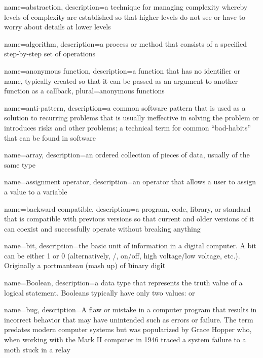 
{
  name=abstraction,
  description={a technique for managing complexity whereby levels of complexity are established so that higher levels do not see or have to worry about details at lower levels}
}

{
  name=algorithm,
  description={a process or method that consists of a specified step-by-step set of operations}
}

{
  name=anonymous function,
  description={a function that has no identifier or name, typically created so that it can be passed as an argument to another function as a callback},
  plural=anonymous functions
}

{
  name=anti-pattern,
  description={a common software pattern that is used as a solution to recurring problems that is usually ineffective in solving the problem or introduces risks and other problems; a technical term for common ``bad-habits'' that can be found in software}
}

{
  name=array,
  description={an ordered collection of pieces of data, usually of the same type}
}

{
  name=assignment operator,
  description={an operator that allows a user to assign a value to a variable}
}

{
  name=backward compatible,
  description={a program, code, library, or standard that is compatible with previous versions so that current
  	and older versions of it can coexist and successfully operate without breaking anything}
}

{
  name=bit,
  description={the basic unit of information in a digital computer.  A bit can be either 1 or 0 (alternatively, \True/\False, 
  	on/off, high voltage/low voltage, etc.).  Originally a portmanteau (mash up) of \textbf{b}inary dig\textbf{it}}
}

{
  name=Boolean,
  description={a data type that represents the truth value of a logical statement.  Booleans typically have only two 
  	values: \True or \False}
}

{
  name=bug,
  description={A flaw or mistake in a computer program that results in incorrect behavior that may have unintended such as errors or failure.  The
  	term predates modern computer systems but was popularized by Grace Hopper who, when working with the Mark II computer in 1946 traced
  	a system failure to a moth stuck in a relay}
}


